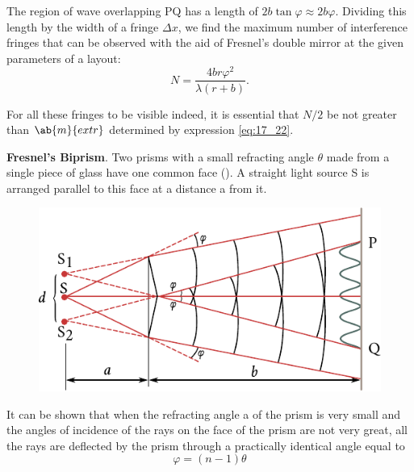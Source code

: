 \noindent
The region of wave overlapping PQ has a length of $2b\tan\varphi\approx 2b\varphi$.
Dividing this length by the width of a fringe $\Delta{x}$, we find the maximum number of interference fringes that can be observed with the
aid of Fresnel's double mirror at the given parameters of a layout:
\begin{equation}\label{eq:17_29}
    N = \frac{4 b r \varphi^2}{\lambda (r + b)}.
\end{equation}

\noindent
For all these fringes to be visible indeed, it is essential that $N/2$ be not greater than $\ab{m}{extr}$ determined by expression \eqref{eq:17_22}.

\textbf{Fresnel's Biprism}.
Two prisms with a small refracting angle $\theta$ made from a single piece of glass have one common face ().
A straight light source S is arranged parallel to this face at a distance a from it.

\begin{figure}[!htb]
	\begin{center}
		\includegraphics[scale=0.98]{figures/ch_17/fig_17_9.pdf}
		\caption[]{}
		\label{fig:17_9}
	\end{center}
	\vspace{-0.9cm}
\end{figure}

It can be shown that when the refracting angle a of the prism is very small and the angles of incidence of the rays on the face of the prism are not very great, all the rays are deflected by the prism through a practically identical angle equal to
\begin{equation*}
    \varphi = (n - 1) \theta
\end{equation*}

